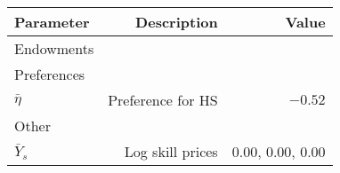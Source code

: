 \begin{tabular}{lrr}
\hline
Parameter & Description  & Value  \\ 
\hline
Endowments &   &   \\ 
Preferences &   &   \\ 
$\bar{\eta}$ & Preference for HS  & $-0.52$  \\ 
Other &   &   \\ 
$\bar{Y}_{s}$ & Log skill prices  & 0.00, 0.00, 0.00  \\ 
\hline
\end{tabular}%
